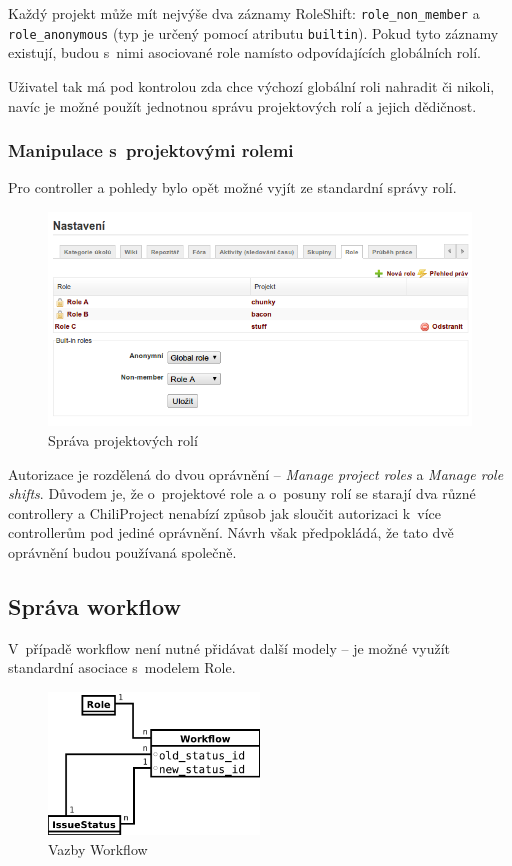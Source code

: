 \documentclass[thesis=B,czech]{FITthesis}[2012/05/02]
\begin{document}
Každý projekt může mít nejvýše dva záznamy RoleShift:
\lstinline!role_non_member! a \lstinline!role_anonymous! (typ je určený
pomocí atributu \lstinline!builtin!). Pokud tyto záznamy existují, budou
s~nimi asociované role namísto odpovídajících globálních rolí.

Uživatel tak má pod kontrolou zda chce výchozí globální roli nahradit či
nikoli, navíc je možné použít jednotnou správu projektových rolí a
jejich dědičnost.

\subsubsection{Manipulace s~projektovými rolemi}

Pro controller a pohledy bylo opět možné vyjít ze standardní správy
rolí.

\begin{figure}[tbp]
\centering
\includegraphics[width=1\textwidth]{role-gui1.png}
\caption{Správa projektových rolí}
\end{figure}

Autorizace je rozdělená do dvou oprávnění -- \emph{Manage project roles} a
\emph{Manage role shifts}. Důvodem je, že o~projektové role a o~posuny rolí
se starají dva různé controllery a ChiliProject nenabízí způsob jak
sloučit autorizaci k~více controllerům pod jediné oprávnění. Návrh však
předpokládá, že tato dvě oprávnění budou používaná společně.

\subsection{Správa workflow}

V~případě \gls{workflow} není nutné přidávat další modely -- je možné
využít standardní asociace s~modelem Role.

\begin{figure}[htbp]
\centering
\includegraphics[width=0.5\textwidth]{role-er3.pdf}
\caption{Vazby Workflow}
\label{fig:Workflow}
\end{figure}
\end{document}
